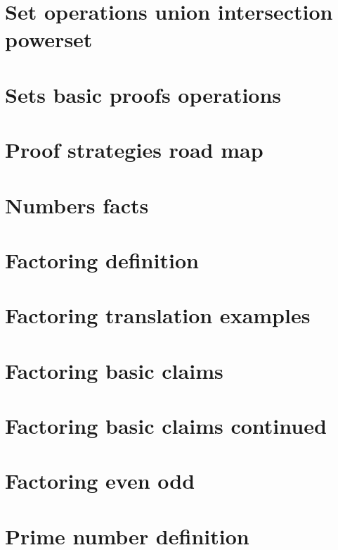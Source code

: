 \section*{Set operations union intersection powerset}

\vfill
\section*{Sets basic proofs operations}

\vfill
\section*{Proof strategies road map}

\vfill
\section*{Numbers facts}

\vfill
\section*{Factoring definition}

\vfill
\section*{Factoring translation examples}

\vfill
\section*{Factoring basic claims}

\vfill
\section*{Factoring basic claims continued}

\vfill
\section*{Factoring even odd}

\vfill
\section*{Prime number definition}

\vfill

